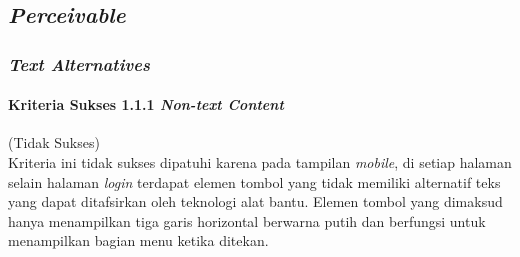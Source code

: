 \subsection{\textit{Perceivable}}
\label{subsec:kepatuhan_bluetape_perceivable}

\subsubsection{\textit{Text Alternatives}}
\label{subsubsec:kepatuhan_bluetape_text_alternatives}

\paragraph{Kriteria Sukses 1.1.1 \textit{Non-text Content}}
\label{par:kepatuhan_bluetape_kriteria_sukses_1.1.1}
(Tidak Sukses)\\

Kriteria ini tidak sukses dipatuhi karena pada tampilan \textit{mobile}, di setiap halaman selain halaman \textit{login} terdapat elemen tombol yang tidak memiliki alternatif teks yang dapat ditafsirkan oleh teknologi alat bantu. Elemen tombol yang dimaksud hanya menampilkan tiga garis horizontal berwarna putih dan berfungsi untuk menampilkan bagian menu ketika ditekan.